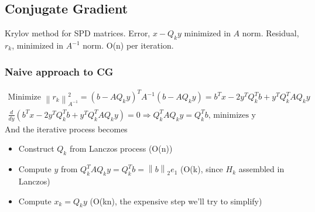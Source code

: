 \documentclass{article}
\newcommand{\norm}[2]{\left\lVert#1\right\rVert_#2}
\begin{document}
\subsection{Conjugate Gradient}
Krylov method for SPD matrices. Error, $x - Q_ky$ minimized in $A$ norm. Residual, $r_k$, minimized in $A^{-1}$ norm. O(n) per iteration.

\subsubsection{Naive approach to CG}
\begin{align*}
    \textrm{Minimize } \norm{r_k}{{A^{-1}}}^2 = (b - AQ_ky)^TA^{-1}(b - AQ_ky) = b^Tx - 2y^TQ_k^Tb + y^TQ_k^TAQ_ky\\
    \frac{d}{dy}\left(b^Tx - 2y^TQ_k^Tb + y^TQ_k^TAQ_ky\right) = 0 \Longrightarrow Q^T_kAQ_ky = Q^T_kb \textrm{, minimizes y}
\end{align*}
And the iterative process becomes
\begin{itemize}
    \item Construct $Q_k$ from Lanczos process (O(n))
    \item Compute $y$ from $Q^T_kAQ_ky = Q^T_kb = \norm{b}{2}e_1$ (O(k), since $H_k$ assembled in Lanczos)
    \item Compute $x_k = Q_ky$ (O(kn), the expensive step we'll try to simplify)
\end{itemize}
\end{document}
